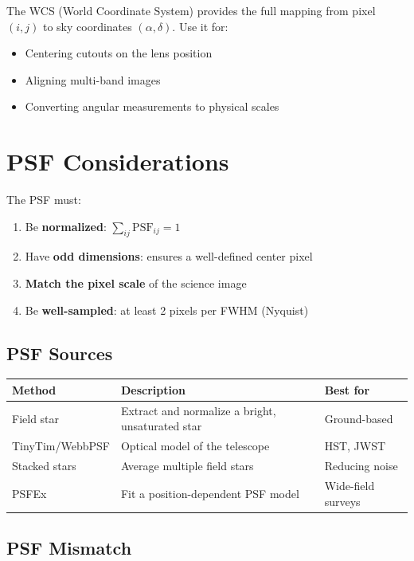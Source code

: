 \documentclass[11pt, letterpaper]{article}
\begin{document}
The WCS (World Coordinate System) provides the full mapping from pixel
$(i, j)$ to sky coordinates $(\alpha, \delta)$. Use it for:
\begin{itemize}[nosep]
  \item Centering cutouts on the lens position
  \item Aligning multi-band images
  \item Converting angular measurements to physical scales
\end{itemize}

\section{PSF Considerations}

The PSF must:
\begin{enumerate}[nosep]
  \item Be \textbf{normalized}: $\sum_{ij} \text{PSF}_{ij} = 1$
  \item Have \textbf{odd dimensions}: ensures a well-defined center pixel
  \item \textbf{Match the pixel scale} of the science image
  \item Be \textbf{well-sampled}: at least 2 pixels per FWHM (Nyquist)
\end{enumerate}

\subsection{PSF Sources}

\begin{table}[H]
\centering
\begin{tabular}{lll}
\toprule
Method & Description & Best for \\
\midrule
Field star & Extract and normalize a bright, unsaturated star & Ground-based \\
TinyTim/WebbPSF & Optical model of the telescope & HST, JWST \\
Stacked stars & Average multiple field stars & Reducing noise \\
PSFEx & Fit a position-dependent PSF model & Wide-field surveys \\
\bottomrule
\end{tabular}
\end{table}

\subsection{PSF Mismatch}
\end{document}
